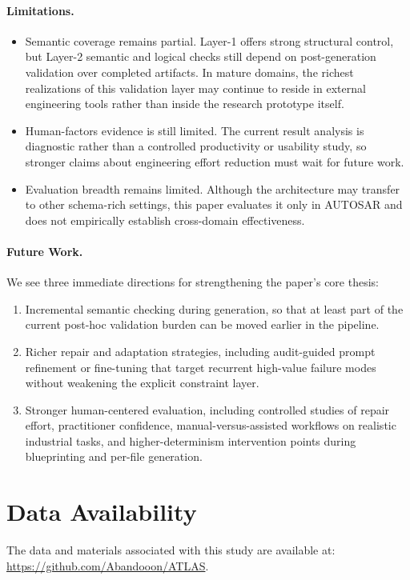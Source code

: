 \documentclass[acmlarge,nonacm]{acmart}
\theoremstyle{acmplain}
\theoremstyle{acmdefinition}
\begin{document}
\paragraph*{Limitations.}
\begin{itemize}[leftmargin=*,itemsep=0.25ex]
  \item Semantic coverage remains partial. Layer-1 offers strong structural control, but Layer-2 semantic and logical checks still depend on post-generation validation over completed artifacts. In mature domains, the richest realizations of this validation layer may continue to reside in external engineering tools rather than inside the research prototype itself.
  \item Human-factors evidence is still limited. The current result analysis is diagnostic rather than a controlled productivity or usability study, so stronger claims about engineering effort reduction must wait for future work.
  \item Evaluation breadth remains limited. Although the architecture may transfer to other schema-rich settings, this paper evaluates it only in AUTOSAR and does not empirically establish cross-domain effectiveness.
\end{itemize}

\paragraph*{Future Work.}
We see three immediate directions for strengthening the paper's core thesis:
\begin{enumerate}[label=\arabic*),leftmargin=*,itemsep=0.4ex]
  \item Incremental semantic checking during generation, so that at least part of the current post-hoc validation burden can be moved earlier in the pipeline.
  \item Richer repair and adaptation strategies, including audit-guided prompt refinement or fine-tuning that target recurrent high-value failure modes without weakening the explicit constraint layer.
  \item Stronger human-centered evaluation, including controlled studies of repair effort, practitioner confidence, manual-versus-assisted workflows on realistic industrial tasks, and higher-determinism intervention points during blueprinting and per-file generation.
\end{enumerate}

\section*{Data Availability}
The data and materials associated with this study are available at: \url{https://github.com/Abandooon/ATLAS}.


 
\end{document}
